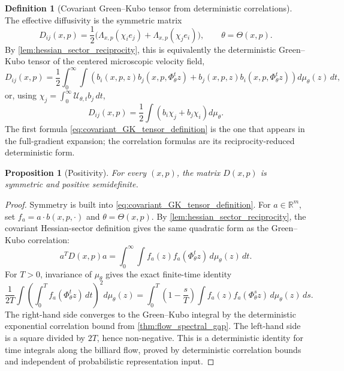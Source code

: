 \documentclass[12pt, letterpaper]{amsart}
\newcommand{\R}{\mathbb{R}}
\theoremstyle{plain}
\newtheorem{proposition}[theorem]{Proposition}
\theoremstyle{definition}
\newtheorem{definition}[theorem]{Definition}
\theoremstyle{remark}
\begin{document}
\begin{definition}[Covariant Green--Kubo tensor from deterministic correlations]
\label{def:GK_tensor}
The effective diffusivity is the symmetric matrix
\begin{equation}
\label{eq:covariant_GK_tensor_definition}
    D_{ij}(x,p)
    =\frac12\bigl(\Lambda_{x,p}(\chi_i e_j)
                 +\Lambda_{x,p}(\chi_j e_i)\bigr),
    \qquad \theta=\Theta(x,p).
\end{equation}
By \cref{lem:hessian_sector_reciprocity}, this is equivalently the deterministic
Green--Kubo tensor of the centered microscopic velocity field,
\begin{equation}
\label{eq:GK_tensor_correlation_formula}
    D_{ij}(x,p)=\frac12\int_0^\infty\int
    \left(b_i(x,p,z)b_j(x,p,\Phi_{\theta}^{t}z)
          +b_j(x,p,z)b_i(x,p,\Phi_{\theta}^{t}z)\right)
    d\mu_\theta(z)\,dt,
\end{equation}
or, using $\chi_j=\int_0^\infty\mathscr{U}_{\theta,t}b_j\,dt$,
\begin{equation}
\label{eq:GK_tensor_corrector_formula}
    D_{ij}(x,p)= \frac12\int
    \left(b_i\chi_j+b_j\chi_i\right)d\mu_\theta .
\end{equation}
The first formula \eqref{eq:covariant_GK_tensor_definition} is the one that
appears in the full-gradient expansion; the correlation formulas are its
reciprocity-reduced deterministic form.
\end{definition}

\begin{proposition}[Positivity]
\label{prop:D_positive}
For every $(x,p)$, the matrix $D(x,p)$ is symmetric and positive semidefinite.
\end{proposition}

\begin{proof}
Symmetry is built into \eqref{eq:covariant_GK_tensor_definition}.  For
$a\in\R^m$, set $f_a=a\cdot b(x,p,\cdot)$ and
$\theta=\Theta(x,p)$.  By \cref{lem:hessian_sector_reciprocity}, the covariant
Hessian-sector definition gives the same quadratic form as the Green--Kubo
correlation:
\begin{equation}
    a^TD(x,p)a=\int_0^\infty\int f_a(z)f_a(\Phi_\theta^t z)\,d\mu_\theta(z)\,dt .
\end{equation}
For $T>0$, invariance of $\mu_\theta$ gives the exact finite-time identity
\begin{equation}
\label{eq:finite_time_square_positivity}
    \frac1{2T}\int\left(\int_0^T f_a(\Phi_\theta^t z)\,dt\right)^2d\mu_\theta(z)
    =\int_0^T\left(1-\frac{s}{T}\right)
      \int f_a(z)f_a(\Phi_\theta^s z)\,d\mu_\theta(z)\,ds .
\end{equation}
The right-hand side converges to the Green--Kubo integral by the deterministic
exponential correlation bound from \cref{thm:flow_spectral_gap}.  The left-hand
side is a square divided by $2T$, hence non-negative.  This is a deterministic
identity for time integrals along the billiard flow, proved by deterministic
correlation bounds and independent of probabilistic representation input.
\end{proof}
\end{document}
